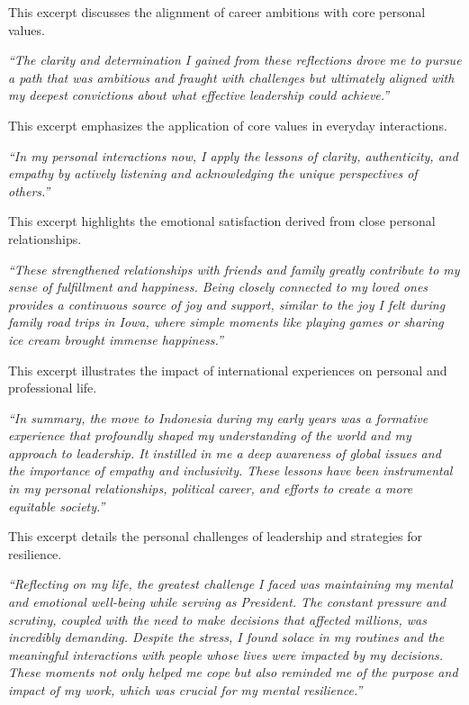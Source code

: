 \noindent This excerpt discusses the alignment of career ambitions with core personal values.
\begin{mdframed}
\textit{``The clarity and determination I gained from these reflections drove me to pursue a path that was ambitious and fraught with challenges but ultimately aligned with my deepest convictions about what effective leadership could achieve.''}
\end{mdframed}

\noindent This excerpt emphasizes the application of core values in everyday interactions.
\begin{mdframed}
\textit{``In my personal interactions now, I apply the lessons of clarity, authenticity, and empathy by actively listening and acknowledging the unique perspectives of others.''}
\end{mdframed}

\noindent This excerpt highlights the emotional satisfaction derived from close personal relationships.
\begin{mdframed}
\textit{``These strengthened relationships with friends and family greatly contribute to my sense of fulfillment and happiness. Being closely connected to my loved ones provides a continuous source of joy and support, similar to the joy I felt during family road trips in Iowa, where simple moments like playing games or sharing ice cream brought immense happiness.''}
\end{mdframed}

\noindent This excerpt illustrates the impact of international experiences on personal and professional life. 
\begin{mdframed}
\textit{``In summary, the move to Indonesia during my early years was a formative experience that profoundly shaped my understanding of the world and my approach to leadership. It instilled in me a deep awareness of global issues and the importance of empathy and inclusivity. These lessons have been instrumental in my personal relationships, political career, and efforts to create a more equitable society.''}
\end{mdframed}

\noindent This excerpt details the personal challenges of leadership and strategies for resilience.
\begin{mdframed}
\textit{``Reflecting on my life, the greatest challenge I faced was maintaining my mental and emotional well-being while serving as President. The constant pressure and scrutiny, coupled with the need to make decisions that affected millions, was incredibly demanding. Despite the stress, I found solace in my routines and the meaningful interactions with people whose lives were impacted by my decisions. These moments not only helped me cope but also reminded me of the purpose and impact of my work, which was crucial for my mental resilience.''}
\end{mdframed}

